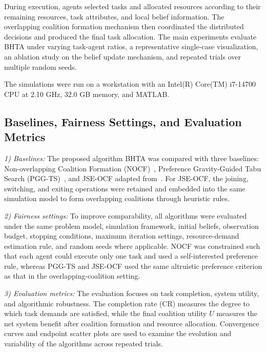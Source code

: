 \documentclass[journal,twoside,web]{ieeecolor}
\begin{document}
During execution, agents selected tasks and allocated resources according to their remaining resources, task attributes, and local belief information. The overlapping coalition formation mechanism then coordinated the distributed decisions and produced the final task allocation. The main experiments evaluate BHTA under varying task-agent ratios, a representative single-case visualization, an ablation study on the belief update mechanism, and repeated trials over multiple random seeds.

The simulations were run on a workstation with an Intel(R) Core(TM) i7-14700 CPU at 2.10 GHz, 32.0 GB memory, and MATLAB.

\subsection{Baselines, Fairness Settings, and Evaluation Metrics}

\noindent\textit{1) Baselines:} The proposed algorithm BHTA was compared with three baselines: Non-overlapping Coalition Formation (NOCF)~\cite{huo2024self}, Preference Gravity-Guided Tabu Search (PGG-TS)~\cite{qi2022task}, and JSE-OCF adapted from~\cite{shi2023federated}. For JSE-OCF, the joining, switching, and exiting operations were retained and embedded into the same simulation model to form overlapping coalitions through heuristic rules.

\noindent\textit{2) Fairness settings:} To improve comparability, all algorithms were evaluated under the same problem model, simulation framework, initial beliefs, observation budget, stopping conditions, maximum iteration settings, resource-demand estimation rule, and random seeds where applicable. NOCF was constrained such that each agent could execute only one task and used a self-interested preference rule, whereas PGG-TS and JSE-OCF used the same altruistic preference criterion as that in the overlapping-coalition setting.

\noindent\textit{3) Evaluation metrics:} The evaluation focuses on task completion, system utility, and algorithmic robustness. The completion rate (CR) measures the degree to which task demands are satisfied, while the final coalition utility $U$ measures the net system benefit after coalition formation and resource allocation. Convergence curves and endpoint scatter plots are used to examine the evolution and variability of the algorithms across repeated trials.
\end{document}
